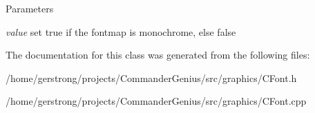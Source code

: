 \begin{DoxyParams}{Parameters}
\item[{\em value}]set true if the fontmap is monochrome, else false \end{DoxyParams}


The documentation for this class was generated from the following files:\begin{DoxyCompactItemize}
\item 
/home/gerstrong/projects/CommanderGenius/src/graphics/CFont.h\item 
/home/gerstrong/projects/CommanderGenius/src/graphics/CFont.cpp\end{DoxyCompactItemize}
